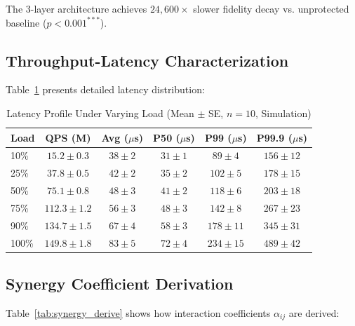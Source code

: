 \documentclass[12pt,a4paper]{article}
\theoremstyle{definition}
\begin{document}
\noindent The 3-layer architecture achieves $24,600\times$ slower fidelity decay vs. unprotected baseline ($p < 0.001^{***}$).

\subsection{Throughput-Latency Characterization}
Table~\ref{tab:latency_profile} presents detailed latency distribution:

\begin{table}[H]
\centering
\caption{Latency Profile Under Varying Load (Mean $\pm$ SE, $n=10$, Simulation)}
\label{tab:latency_profile}
\begin{tabular}{lccccc}
\toprule
\textbf{Load} & \textbf{QPS (M)} & \textbf{Avg ($\mu$s)} & \textbf{P50 ($\mu$s)} & \textbf{P99 ($\mu$s)} & \textbf{P99.9 ($\mu$s)} \\
\midrule
10\% & $15.2 \pm 0.3$ & $38 \pm 2$ & $31 \pm 1$ & $89 \pm 4$ & $156 \pm 12$ \\
25\% & $37.8 \pm 0.5$ & $42 \pm 2$ & $35 \pm 2$ & $102 \pm 5$ & $178 \pm 15$ \\
50\% & $75.1 \pm 0.8$ & $48 \pm 3$ & $41 \pm 2$ & $118 \pm 6$ & $203 \pm 18$ \\
75\% & $112.3 \pm 1.2$ & $56 \pm 3$ & $48 \pm 3$ & $142 \pm 8$ & $267 \pm 23$ \\
90\% & $134.7 \pm 1.5$ & $67 \pm 4$ & $58 \pm 3$ & $178 \pm 11$ & $345 \pm 31$ \\
100\% & $149.8 \pm 1.8$ & $83 \pm 5$ & $72 \pm 4$ & $234 \pm 15$ & $489 \pm 42$ \\
\bottomrule
\end{tabular}
\end{table}

\subsection{Synergy Coefficient Derivation}
Table~\ref{tab:synergy_derive} shows how interaction coefficients $\alpha_{ij}$ are derived:
\end{document}
